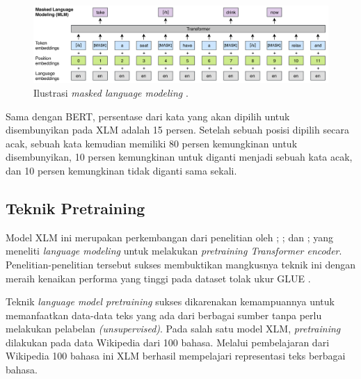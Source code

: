     \begin{figure}[ht]
        \centering
        \includegraphics[width=1\textwidth]{resources/ilustrasi-mlm.png}
        \caption{Ilustrasi \textit{masked language modeling} \parencite{LampleConneau2019}.}
        \label{fig:ilustrasi_mlm}
    \end{figure}

    Sama dengan BERT, persentase dari kata yang akan dipilih untuk disembunyikan pada XLM adalah 15 persen. Setelah sebuah posisi dipilih secara acak, sebuah kata kemudian memiliki 80 persen kemungkinan untuk disembunyikan, 10 persen kemungkinan untuk diganti menjadi sebuah kata acak, dan 10 persen kemungkinan tidak diganti sama sekali.

    \subsection{Teknik Pretraining}
    Model XLM ini merupakan perkembangan dari penelitian oleh \parencite{radford2018improving}; \parencite{HowardRuder2018}; dan \parencite{Devlin_Chang_Lee_Toutanova_2019}; yang meneliti \textit{language modeling} untuk melakukan \textit{pretraining Transformer encoder}. Penelitian-penelitian tersebut sukses membuktikan mangkusnya teknik ini dengan meraih kenaikan performa yang tinggi pada dataset tolak ukur GLUE \parencite{GLUE2019}.

    Teknik \textit{language model pretraining} sukses dikarenakan kemampuannya untuk memanfaatkan data-data teks yang ada dari berbagai sumber tanpa perlu melakukan pelabelan \textit{(unsupervised)}. Pada salah satu model XLM, \textit{pretraining} dilakukan pada data Wikipedia dari 100 bahasa. Melalui pembelajaran dari Wikipedia 100 bahasa ini XLM berhasil mempelajari representasi teks berbagai bahasa.

